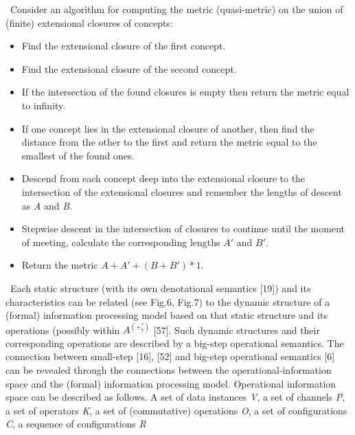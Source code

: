 \documentclass[10pt, a4paper]{article}
\begin{document}
\begin{multicols}{2}
\begin{itemize} [noitemsep]
\end{itemize} 
\linespread{0.8}
\par \ Consider an algorithm for computing the metric
(quasi-metric) on the union of (finite) extensional closures of concepts:

\begin{itemize}[noitemsep] \fontsize{10}{15}\selectfont
 \item[1] Find the extensional closure of the first concept.
 \item[2] Find the extensional closure of the second concept.
 \item[3] If the intersection of the found closures is empty
then return the metric equal to infinity.
\item[4] If one concept lies in the extensional closure of
another, then find the distance from the other to
the first and return the metric equal to the smallest
of the found ones.
\item[5] Descend from each concept deep into the extensional closure to the intersection of the extensional
closures and remember the lengths of descent as \textit{A} 
and \textit{B}.
\item[6] Stepwise descent in the intersection of closures to continue until the moment of meeting, calculate the
corresponding lengths \begin{math} A'
\end{math} and \begin{math} B'.
\end{math}
\item[7] Return the metric  \begin{math} A + A' + (B+B') * 1. \end{math}
\end{itemize}
\par \ Each static structure (with its own denotational semantics [19]) and its characteristics can be related (see Fig.6, Fig.7) to the dynamic structure of a (formal) information processing model based on that static structure and its operations (possibly within \begin{math} {A^{(+_{7}^{*})}}
\end{math} [57]. Such dynamic structures and their corresponding operations are described by a big-step operational semantics. The connection between small-step [16], [52] and big-step operational semantics [6] can be revealed through the connections between the operational-information space and the (formal) information processing model. Operational information space can be described as follows. A set of data instances \textit{V}, a set of channels \textit{P}, a set of operators \textit{K}, a set of (commutative) operations \textit{O}, a set of configurations \textit{C}, a sequence of configurations \textit{R} 

\end{multicols}
\end{document}
